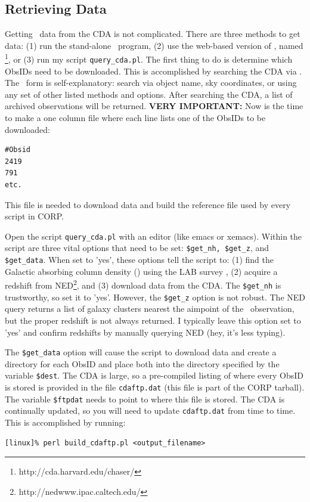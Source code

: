 \subsection{Retrieving Data}

Getting \chandra\ data from the CDA is not complicated. There are
three methods to get data: (1) run the stand-alone \chaser\ program,
(2) use the web-based version of \chaser, named
\webchaser\footnote{http://cda.harvard.edu/chaser/}, or (3) run my
script {\tt{query\_cda.pl}}. The first thing to do is determine which
ObsIDs need to be downloaded. This is accomplished by searching the
CDA via \webchaser. The \webchaser\ form is self-explanatory: search
via object name, sky coordinates, or using any set of other listed
methods and options. After searching the CDA, a list of archived
observations will be returned. {\bf{VERY IMPORTANT:}} Now is the time
to make a one column file where each line lists one of the ObsIDs to
be downloaded:
\begin{verbatim}
#Obsid
2419
791
etc.
\end{verbatim}
This file is needed to download data and build the reference file used
by every script in CORP.

Open the script {\tt{query\_cda.pl}} with an editor (like emacs or
xemacs). Within the script are three vital options that need to be
set: {\tt{\$get\_nh, \$get\_z}}, and {\tt{\$get\_data}}. When set to
'yes', these options tell the script to: (1) find the Galactic
absorbing column density (\nhi) using the LAB survey \citep{lab}, (2)
acquire a redshift from NED\footnote{http://nedwww.ipac.caltech.edu/},
and (3) download data from the CDA. The {\tt{\$get\_nh}} is
trustworthy, so set it to 'yes'. However, the {\tt{\$get\_z}} option
is not robust. The NED query returns a list of galaxy clusters nearest
the aimpoint of the \chandra\ observation, but the proper redshift is
not always returned. I typically leave this option set to 'yes' and
confirm redshifts by manually querying NED (hey, it's less
typing).

The {\tt{\$get\_data}} option will cause the script to download data and
create a directory for each ObsID and place both into the directory
specified by the variable {\tt{\$dest}}. The CDA is large, so a
pre-compiled listing of where every ObsID is stored is provided in the
file {\tt{cdaftp.dat}} (this file is part of the CORP tarball). The
variable {\tt{\$ftpdat}} needs to point to where this file is
stored. The CDA is continually updated, so you will need to update
{\tt{cdaftp.dat}} from time to time. This is accomplished by running:
\begin{verbatim}
[linux]% perl build_cdaftp.pl <output_filename>
\end{verbatim}

